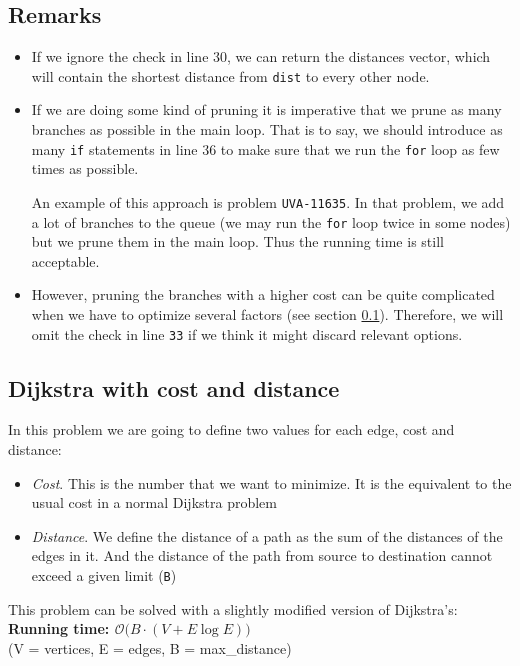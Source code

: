 \documentclass[12pt]{report}
\begin{document}
\subsection*{Remarks}
\begin{itemize}
	\item If we ignore the check in line 30, we can return the distances 
		vector, which will contain the shortest distance from \texttt{dist}
		to every other node.
	\item If we are doing some kind of pruning it is imperative that we prune 
	as many branches as possible in the main loop. That is to say, we should
	introduce as many \texttt{if} statements in line 36 to make sure that we
	run the \texttt{for} loop as few times as possible. 

	An example of this approach is problem \texttt{UVA-11635}. In that problem, we
	add a lot of branches to the queue (we may run the \texttt{for} loop
	twice in some nodes) but we prune them in the main loop. Thus the 
	running time is still acceptable.

\item  However, pruning the branches with a higher cost can be quite complicated 
	when we have to optimize several factors (see section \ref{graph:dijkstra:distances}).
	Therefore, we will omit the check in line \texttt{33} if we think it might discard 
	relevant options.

\end{itemize}

\newpage
\subsection{Dijkstra with cost and distance}
\label{graph:dijkstra:distances}
In this problem we are going to define two values for each edge, cost and distance:
\begin{itemize}
	\setlength\itemsep{0 pt}
	\item \textit{Cost}. This is the number that we want to minimize. It is the 
		equivalent to the usual cost in a normal Dijkstra problem
	\item \textit{Distance}. We define the distance of a path as the sum of the
		distances of the edges in it. And the distance of the path from source
		to destination cannot exceed a given limit (\texttt{B})
\end{itemize}
This problem can be solved with a slightly modified version of Dijkstra's:
\noindent \textbf{\boldmath Running time: $\mathcal{O}\big(B\cdot(V+E\log E)\big)$}
\\ {\small(V = vertices, E = edges, B = max\_distance)}
\end{document}
